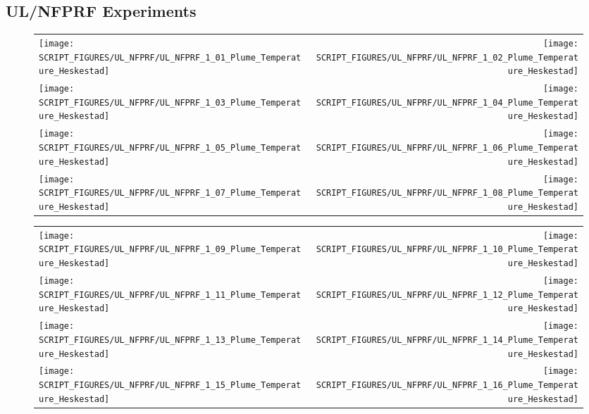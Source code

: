 \clearpage

\subsection{UL/NFPRF Experiments}

\begin{figure}[p]
\begin{tabular*}{\textwidth}{l@{\extracolsep{\fill}}r}
\texttt{[image: SCRIPT\_FIGURES/UL\_NFPRF/UL\_NFPRF\_1\_01\_Plume\_Temperature\_Heskestad]} &
\texttt{[image: SCRIPT\_FIGURES/UL\_NFPRF/UL\_NFPRF\_1\_02\_Plume\_Temperature\_Heskestad]} \\
\texttt{[image: SCRIPT\_FIGURES/UL\_NFPRF/UL\_NFPRF\_1\_03\_Plume\_Temperature\_Heskestad]} &
\texttt{[image: SCRIPT\_FIGURES/UL\_NFPRF/UL\_NFPRF\_1\_04\_Plume\_Temperature\_Heskestad]} \\
\texttt{[image: SCRIPT\_FIGURES/UL\_NFPRF/UL\_NFPRF\_1\_05\_Plume\_Temperature\_Heskestad]} &
\texttt{[image: SCRIPT\_FIGURES/UL\_NFPRF/UL\_NFPRF\_1\_06\_Plume\_Temperature\_Heskestad]} \\
\texttt{[image: SCRIPT\_FIGURES/UL\_NFPRF/UL\_NFPRF\_1\_07\_Plume\_Temperature\_Heskestad]} &
\texttt{[image: SCRIPT\_FIGURES/UL\_NFPRF/UL\_NFPRF\_1\_08\_Plume\_Temperature\_Heskestad]}
\end{tabular*}
\end{figure}

\begin{figure}[p]
\begin{tabular*}{\textwidth}{l@{\extracolsep{\fill}}r}
\texttt{[image: SCRIPT\_FIGURES/UL\_NFPRF/UL\_NFPRF\_1\_09\_Plume\_Temperature\_Heskestad]} &
\texttt{[image: SCRIPT\_FIGURES/UL\_NFPRF/UL\_NFPRF\_1\_10\_Plume\_Temperature\_Heskestad]} \\
\texttt{[image: SCRIPT\_FIGURES/UL\_NFPRF/UL\_NFPRF\_1\_11\_Plume\_Temperature\_Heskestad]} &
\texttt{[image: SCRIPT\_FIGURES/UL\_NFPRF/UL\_NFPRF\_1\_12\_Plume\_Temperature\_Heskestad]} \\
\texttt{[image: SCRIPT\_FIGURES/UL\_NFPRF/UL\_NFPRF\_1\_13\_Plume\_Temperature\_Heskestad]} &
\texttt{[image: SCRIPT\_FIGURES/UL\_NFPRF/UL\_NFPRF\_1\_14\_Plume\_Temperature\_Heskestad]} \\
\texttt{[image: SCRIPT\_FIGURES/UL\_NFPRF/UL\_NFPRF\_1\_15\_Plume\_Temperature\_Heskestad]} &
\texttt{[image: SCRIPT\_FIGURES/UL\_NFPRF/UL\_NFPRF\_1\_16\_Plume\_Temperature\_Heskestad]}
\end{tabular*}
\end{figure}

